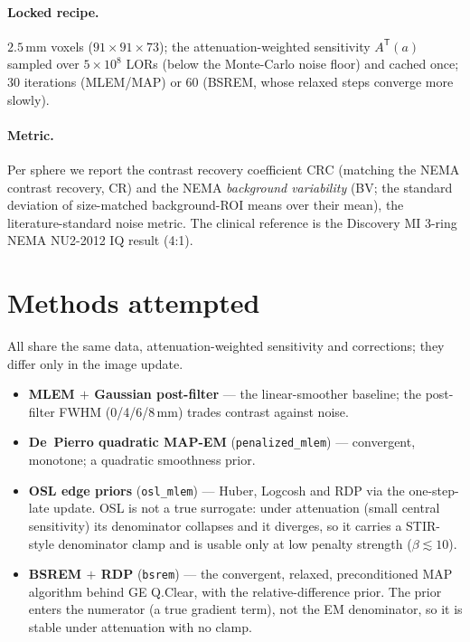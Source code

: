 \documentclass[11pt]{article}
\newcommand{\code}[1]{\texttt{#1}}
\newcommand{\CRC}{\mathrm{CRC}}
\begin{document}
\paragraph{Locked recipe.} $2.5$\,mm voxels ($91\times91\times73$); the
attenuation-weighted sensitivity $A^{\mathsf{T}}(a)$ sampled over $5\times10^{8}$ LORs
(below the Monte-Carlo noise floor) and cached once; 30 iterations (MLEM/MAP) or 60
(BSREM, whose relaxed steps converge more slowly).

\paragraph{Metric.} Per sphere we report the contrast recovery coefficient $\CRC$
(matching the NEMA contrast recovery, CR) and the NEMA \emph{background variability}
(BV; the standard deviation of size-matched background-ROI means over their mean), the
literature-standard noise metric. The clinical reference is the Discovery MI 3-ring
NEMA NU2-2012 IQ result (4:1).

\section{Methods attempted}
All share the same data, attenuation-weighted sensitivity and corrections; they differ
only in the image update.
\begin{itemize}
  \item \textbf{MLEM $+$ Gaussian post-filter} --- the linear-smoother baseline; the
        post-filter FWHM (0/4/6/8\,mm) trades contrast against noise.
  \item \textbf{De~Pierro quadratic MAP-EM} (\code{penalized\_mlem}) --- convergent,
        monotone; a quadratic smoothness prior.
  \item \textbf{OSL edge priors} (\code{osl\_mlem}) --- Huber, Logcosh and RDP via the
        one-step-late update. OSL is not a true surrogate: under attenuation (small
        central sensitivity) its denominator collapses and it diverges, so it carries a
        STIR-style denominator clamp and is usable only at low penalty strength
        ($\beta\!\lesssim\!10$).
  \item \textbf{BSREM $+$ RDP} (\code{bsrem}) --- the convergent, relaxed,
        preconditioned MAP algorithm behind GE Q.Clear, with the relative-difference
        prior. The prior enters the numerator (a true gradient term), not the EM
        denominator, so it is stable under attenuation with no clamp.
\end{itemize}
\end{document}
